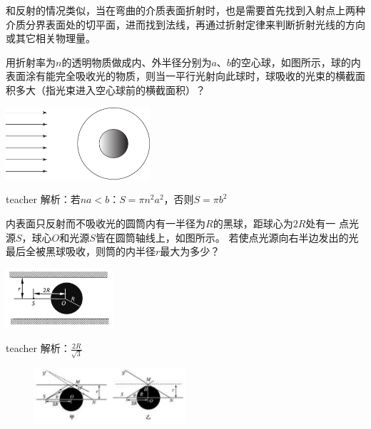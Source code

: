 和反射的情况类似，当在弯曲的介质表面折射时，也是需要首先找到入射点上两种介质分界表面处的切平面，进而找到法线，再通过折射定律来判断折射光线的方向或其它相关物理量。
\begin{example}
用折射率为$ n $的透明物质做成内、外半径分别为$ a$、$b $的空心球，如图所示，球的内表面涂有能完全吸收光的物质，则当一平行光射向此球时，球吸收的光束的横截面积多大（指光束进入空心球前的横截面积）？
	\begin{flushright}
		\includegraphics[width = 0.4\textwidth]{images/opt-4.pdf} 
	\end{flushright}
\begin{taggedblock}{teacher}
\noindent
解析：若$na<b$：$S=\pi n^2a^2$，否则$S=\pi b^2$
\end{taggedblock}
\end{example}

\begin{example}
	内表面只反射而不吸收光的圆筒内有一半径为$ R $的黑球，距球心为$ 2R $处有一 点光源$ S$，球心$O$和光源$ S$皆在圆筒轴线上，如图所示。
	若使点光源向右半边发出的光最后全被黑球吸收，则筒的内半径$ r $最大为多少？
		\begin{flushright}
			\includegraphics[width = 0.3\textwidth]{images/opt-15.pdf} 
		\end{flushright}
	\begin{taggedblock}{teacher}
		\noindent
		解析：$\frac{2R}{\sqrt{3}}$
		\begin{figure}[hbtp]
					\includegraphics[width = 0.5\textwidth]{images/opt-4-5.pdf}
				\end{figure}
	\end{taggedblock}
\end{example}

